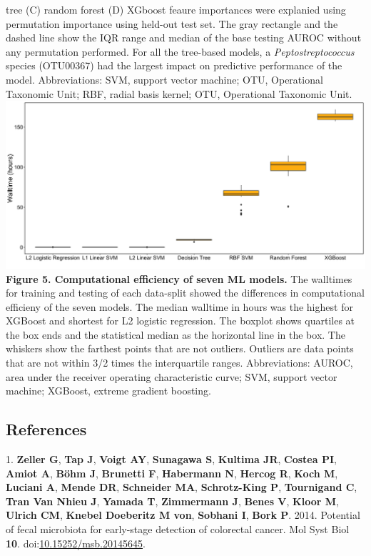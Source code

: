 \documentclass[11pt,]{article}
\begin{document}
tree (C) random forest (D) XGboost feaure importances were explanied
using permutation importance using held-out test set. The gray rectangle
and the dashed line show the IQR range and median of the base testing
AUROC without any permutation performed. For all the tree-based models,
a \emph{Peptostreptococcus} species (OTU00367) had the largest impact on
predictive performance of the model. Abbreviations: SVM, support vector
machine; OTU, Operational Taxonomic Unit; RBF, radial basis kernel; OTU,
Operational Taxonomic Unit. \newpage
\includegraphics{Figure_5.png} \textbf{Figure 5. Computational
efficiency of seven ML models.} The walltimes for training and testing
of each data-split showed the differences in computational efficieny of
the seven models. The median walltime in hours was the highest for
XGBoost and shortest for L2 logistic regression. The boxplot shows
quartiles at the box ends and the statistical median as the horizontal
line in the box. The whiskers show the farthest points that are not
outliers. Outliers are data points that are not within 3/2 times the
interquartile ranges. Abbreviations: AUROC, area under the receiver
operating characteristic curve; SVM, support vector machine; XGBoost,
extreme gradient boosting.\\
\newpage

\subsection{References}\label{references}

\hypertarget{refs}{}
\hypertarget{ref-zeller_potential_2014}{}
1. \textbf{Zeller G}, \textbf{Tap J}, \textbf{Voigt AY},
\textbf{Sunagawa S}, \textbf{Kultima JR}, \textbf{Costea PI},
\textbf{Amiot A}, \textbf{Böhm J}, \textbf{Brunetti F},
\textbf{Habermann N}, \textbf{Hercog R}, \textbf{Koch M},
\textbf{Luciani A}, \textbf{Mende DR}, \textbf{Schneider MA},
\textbf{Schrotz-King P}, \textbf{Tournigand C}, \textbf{Tran Van Nhieu
J}, \textbf{Yamada T}, \textbf{Zimmermann J}, \textbf{Benes V},
\textbf{Kloor M}, \textbf{Ulrich CM}, \textbf{Knebel Doeberitz M von},
\textbf{Sobhani I}, \textbf{Bork P}. 2014. Potential of fecal microbiota
for early-stage detection of colorectal cancer. Mol Syst Biol
\textbf{10}.
doi:\href{https://doi.org/10.15252/msb.20145645}{10.15252/msb.20145645}.
\end{document}
